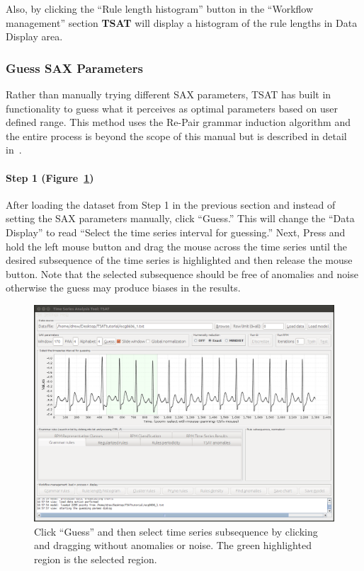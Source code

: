 \documentclass[letterpaper, 12pt]{article}
\newcommand\TSAT{\textbf{TSAT}}
\begin{document}
Also, by clicking the ``Rule length histogram'' button in the ``Workflow management'' section {\TSAT} will display a histogram of the rule lengths in Data Display area.



\subsubsection{Guess SAX Parameters}

Rather than manually trying different SAX parameters, TSAT has built in functionality to guess what it perceives as optimal parameters based on user defined range.  This method uses the Re-Pair grammar induction algorithm and the entire process is beyond the scope of this manual but is described in detail in~\cite{paramSelection}.

\paragraph{Step 1 (Figure~\ref{fig:step1-guess})} After loading the dataset from Step 1 in the previous section and instead of setting the SAX parameters manually, click ``Guess.''  This will change the ``Data Display'' to read ``Select the time series interval for guessing.'' Next, Press and hold the left mouse button and drag the mouse across the time series until the desired subsequence of the time series is highlighted and then release the mouse button.  Note that the selected subsequence should be free of anomalies and noise otherwise the guess may produce biases in the results.

\begin{figure}[H]
	\centering
	\includegraphics[width=\textwidth]{pictures/motifguide/step1-guess}
	\caption{Click ``Guess'' and then select time series subsequence by clicking and dragging without anomalies or noise.  The green highlighted region is the selected region. }
	\label{fig:step1-guess}
\end{figure}
\end{document}

